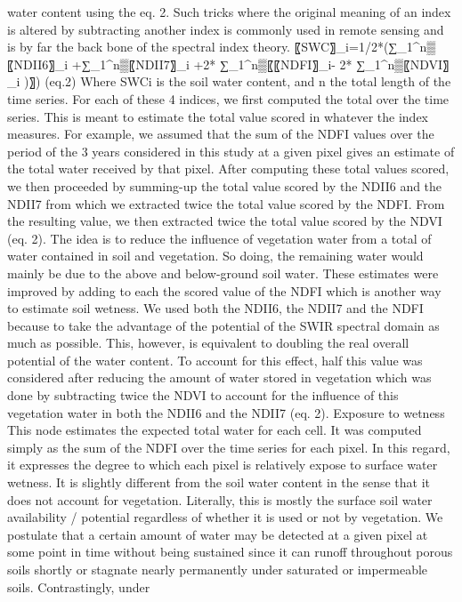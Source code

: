 \documentclass[12pt,oneside]{article}
\begin{document}
water content using the eq. 2. Such tricks where the original meaning of
an index is altered by subtracting another index is commonly used in
remote sensing and is by far the back bone of the spectral index theory.
〖SWC〗\_i=1/2*(∑\_1\^{}n▒〖NDII6〗\_i +∑\_1\^{}n▒〖NDII7〗\_i +2*
∑\_1\^{}n▒〖〖NDFI〗\_i- 2* ∑\_1\^{}n▒〖NDVI〗\_i )〗) (eq.2) Where SWCi
is the soil water content, and n the total length of the time series.
For each of these 4 indices, we first computed the total over the time
series. This is meant to estimate the total value scored in whatever the
index measures. For example, we assumed that the sum of the NDFI values
over the period of the 3 years considered in this study at a given pixel
gives an estimate of the total water received by that pixel. After
computing these total values scored, we then proceeded by summing-up the
total value scored by the NDII6 and the NDII7 from which we extracted
twice the total value scored by the NDFI. From the resulting value, we
then extracted twice the total value scored by the NDVI (eq. 2). The
idea is to reduce the influence of vegetation water from a total of
water contained in soil and vegetation. So doing, the remaining water
would mainly be due to the above and below-ground soil water. These
estimates were improved by adding to each the scored value of the NDFI
which is another way to estimate soil wetness. We used both the NDII6,
the NDII7 and the NDFI because to take the advantage of the potential of
the SWIR spectral domain as much as possible. This, however, is
equivalent to doubling the real overall potential of the water content.
To account for this effect, half this value was considered after
reducing the amount of water stored in vegetation which was done by
subtracting twice the NDVI to account for the influence of this
vegetation water in both the NDII6 and the NDII7 (eq. 2). Exposure to
wetness This node estimates the expected total water for each cell. It
was computed simply as the sum of the NDFI over the time series for each
pixel. In this regard, it expresses the degree to which each pixel is
relatively expose to surface water wetness. It is slightly different
from the soil water content in the sense that it does not account for
vegetation. Literally, this is mostly the surface soil water
availability / potential regardless of whether it is used or not by
vegetation. We postulate that a certain amount of water may be detected
at a given pixel at some point in time without being sustained since it
can runoff throughout porous soils shortly or stagnate nearly
permanently under saturated or impermeable soils. Contrastingly, under
\end{document}
